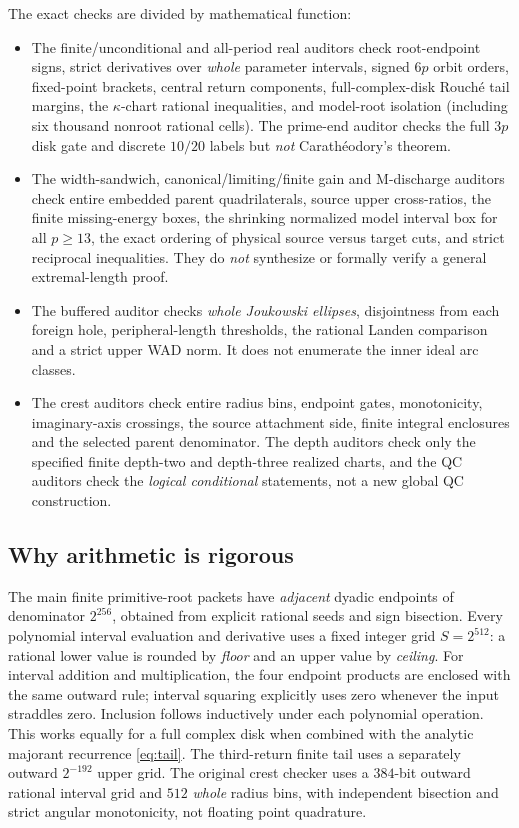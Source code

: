 The exact checks are divided
by mathematical function:
\begin{itemize}
\item The finite/unconditional
and all-period real auditors
check root-endpoint signs,
strict derivatives over
\emph{whole} parameter
intervals, signed
$6p$ orbit orders,
fixed-point brackets,
central return components,
full-complex-disk
Rouch\'e tail margins,
the $\kappa$-chart
rational inequalities,
and model-root isolation
(including six thousand
nonroot rational cells).
The prime-end auditor
checks the full
$3p$ disk gate
and discrete
$10/20$ labels
but \emph{not}
Carath\'eodory's theorem.
\item The width-sandwich,
canonical/limiting/finite
gain and M-discharge
auditors check entire
embedded parent
quadrilaterals,
source upper
cross-ratios,
the finite
missing-energy boxes,
the shrinking
normalized model
interval box
for all $p\ge13$,
the exact ordering
of physical source
versus target cuts,
and strict
reciprocal inequalities.
They do \emph{not}
synthesize or formally
verify a general
extremal-length proof.
\item The buffered auditor
checks \emph{whole
Joukowski ellipses},
disjointness from
each foreign hole,
peripheral-length
thresholds,
the rational
Landen comparison
and a strict
upper WAD norm.
It does not
enumerate the
inner ideal
arc classes.
\item The crest auditors
check entire
radius bins,
endpoint gates,
monotonicity,
imaginary-axis
crossings, the
source attachment
side, finite
integral enclosures
and the selected
parent denominator.
The depth auditors
check only the
specified finite
depth-two and
depth-three
realized charts,
and the QC
auditors check
the \emph{logical
conditional}
statements, not
a new global
QC construction.
\end{itemize}

\subsection{Why arithmetic is rigorous}
The main finite
primitive-root
packets have
\emph{adjacent}
dyadic endpoints
of denominator
$2^{256}$, obtained
from explicit
rational seeds and
sign bisection.
Every polynomial
interval evaluation
and derivative
uses a fixed
integer grid
$S=2^{512}$:
a rational lower
value is rounded
by \emph{floor}
and an upper
value by
\emph{ceiling}.
For interval
addition and
multiplication,
the four
endpoint products
are enclosed
with the same
outward rule;
interval squaring
explicitly uses
zero whenever
the input
straddles zero.
Inclusion
follows inductively
under each
polynomial
operation.
This works
equally for a
full complex
disk when
combined with
the analytic
majorant
recurrence
\eqref{eq:tail}.
The third-return
finite tail
uses a separately
outward $2^{-192}$
upper grid.
The original
crest checker
uses a $384$-bit
outward rational
interval grid
and $512$
\emph{whole}
radius bins,
with independent
bisection and
strict angular
monotonicity,
not floating
point quadrature.

